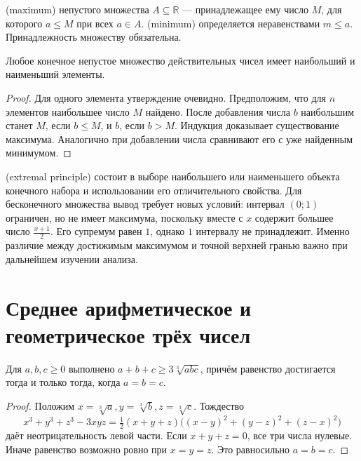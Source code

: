 \begin{definition}
 (maximum) непустого множества \(A\subseteq\mathbb R\) — принадлежащее ему число \(M\), для которого \(a\le M\) при всех \(a\in A\).  (minimum) определяется неравенствами \(m\le a\). Принадлежность множеству обязательна.
\end{definition}
\begin{theorem}\label{thm:legacy-c17-7}
Любое конечное непустое множество действительных чисел имеет наибольший и наименьший элементы.
\end{theorem}
\begin{proof}
Для одного элемента утверждение очевидно. Предположим, что для \(n\) элементов наибольшее число \(M\) найдено. После добавления числа \(b\) наибольшим станет \(M\), если \(b\le M\), и \(b\), если \(b>M\). Индукция доказывает существование максимума. Аналогично при добавлении числа сравнивают его с уже найденным минимумом.
\end{proof}
 (extremal principle) состоит в выборе наибольшего или наименьшего объекта конечного набора и использовании его отличительного свойства. Для бесконечного множества вывод требует новых условий: интервал \((0;1)\) ограничен, но не имеет максимума, поскольку вместе с \(x\) содержит большее число \(\frac{x+1}{2}\). Его супремум равен \(1\), однако \(1\) интервалу не принадлежит. Именно различие между достижимым максимумом и точной верхней гранью важно при дальнейшем изучении анализа.


\section{Среднее арифметическое и геометрическое трёх чисел}
\begin{theorem}
Для \(a,b,c\ge0\) выполнено \(a+b+c\ge3\sqrt[3]{abc}\), причём равенство достигается тогда и только тогда, когда \(a=b=c\).
\end{theorem}
\begin{proof}Положим \(x=\sqrt[3]a,y=\sqrt[3]b,z=\sqrt[3]c\). Тождество
\[
x^3+y^3+z^3-3xyz=\tfrac12(x+y+z)\bigl((x-y)^2+(y-z)^2+(z-x)^2\bigr)
\]
даёт неотрицательность левой части. Если \(x+y+z=0\), все три числа нулевые. Иначе равенство возможно ровно при \(x=y=z\). Это равносильно \(a=b=c\).\end{proof}

